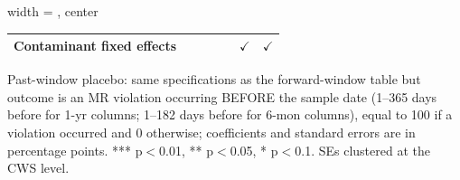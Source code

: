 \begin{table}[htbp]
\begin{adjustbox}{width = \textwidth, center}
\begin{tabular}{lrrrrrr}
      Contaminant fixed effects  &                   &                      &                   &                      & $\checkmark$       & $\checkmark$\\   
      \bottomrule
   \end{tabular}
\end{adjustbox}
{\tiny\linespread{1}\selectfont \par \raggedright Past-window placebo: same specifications as the forward-window table but outcome is an MR violation occurring BEFORE the sample date (1--365 days before for 1-yr columns; 1--182 days before for 6-mon columns), equal to 100 if a violation occurred and 0 otherwise; coefficients and standard errors are in percentage points. *** p$<$0.01, ** p$<$0.05, * p$<$0.1. SEs clustered at the CWS level.}
\end{table}
